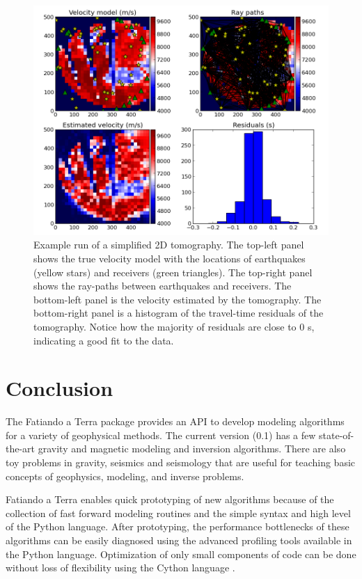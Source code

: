 \begin{figure}
    \centering
    \includegraphics[width=\textwidth]{figures/paper1/seismic_tomo}
    \caption{
        Example run of a simplified 2D tomography. The top-left panel shows the
        true velocity model with the locations of earthquakes (yellow stars)
        and receivers (green triangles). The top-right panel shows the
        ray-paths between earthquakes and receivers. The bottom-left panel is
        the velocity estimated by the tomography. The bottom-right panel is a
        histogram of the travel-time residuals of the tomography. Notice how
        the majority of residuals are close to 0 s, indicating a good fit to
        the data.
    }
    \label{fig:tomo}
\end{figure}




\section{Conclusion}

The Fatiando a Terra package provides an API to develop modeling
algorithms for a variety of geophysical methods. The current version
(0.1) has a few state-of-the-art gravity and magnetic modeling and
inversion algorithms. There are also toy problems in gravity, seismics
and seismology that are useful for teaching basic concepts of
geophysics, modeling, and inverse problems.

Fatiando a Terra enables quick prototyping of new algorithms because of
the collection of fast forward modeling routines and the simple syntax
and high level of the Python language. After prototyping, the
performance bottlenecks of these algorithms can be easily diagnosed
using the advanced profiling tools available in the Python language.
Optimization of only small components of code can be done without loss
of flexibility using the Cython language \citep{behnel2011}.

